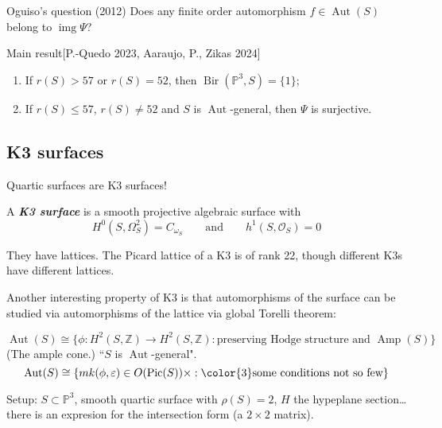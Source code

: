\begin{thing4}{Oguiso's question (2012)}\leavevmode
Does any finite order automorphism \(f \in \operatorname{Aut}(S)\) belong to \(\operatorname{img}\Psi\)?
\end{thing4}

\begin{thing6}{Main result}[P.-Quedo 2023, Aaraujo, P., Zikas 2024]\leavevmode
\begin{enumerate}[label=(\roman*)]
\item If \(r(S)> 57\) or \(r(S)=52\), then \(\operatorname{Bir}(\mathbb{P}^3,S)=\{1\}\);
\item If \(r(S) \leq 57\), \(r(S) \neq 52\) and \(S\) is \(\operatorname{Aut}\)-general, then \(\Psi\) is surjective.
\end{enumerate}
\end{thing6}

\subsection{K3 surfaces}

Quartic surfaces are K3 surfaces!

\begin{defn}\leavevmode
A \textit{\textbf{K3 surface}} is a smooth projective algebraic surface with
\[H^{0}(S,\Omega^{2}_S) = C_{\omega_S}\qquad \text{and} \qquad h^1(S,\mathcal{O}_S)=0\]
\end{defn}

They have lattices. The Picard lattice of a K3 is of rank 22, though different K3s have different lattices.

Another interesting property of K3 is that automorphisms of the surface can be studied via automorphisms of the lattice via global Torelli theorem:

\begin{thm}\leavevmode
\[\operatorname{Aut}(S)\cong \{\phi:H^{2}(S,\mathbb{Z})\to H^{2}(S,\mathbb{Z}):\text{preserving Hodge structure and }\operatorname{Am p}(S) \}\]
(The ample cone.) ``\(S\) is \(\operatorname{Aut}\)-general".
\[\operatorname{Aut}(S) \cong\{mk(\phi,\varepsilon) \in O(\operatorname{Pic}(S) ) \times :{\color{3}\text{some conditions not so few} }\}\]
\end{thm}

\begin{example}[Case \(\rho(S)=2\)]\leavevmode
Setup: \(S \subset \mathbb{P}^3\), smooth quartic surface with \(\rho(S)=2\), \(H\) the hypeplane section… there is an expresion for the intersection form (a \(2 \times 2\) matrix).
\end{example}


